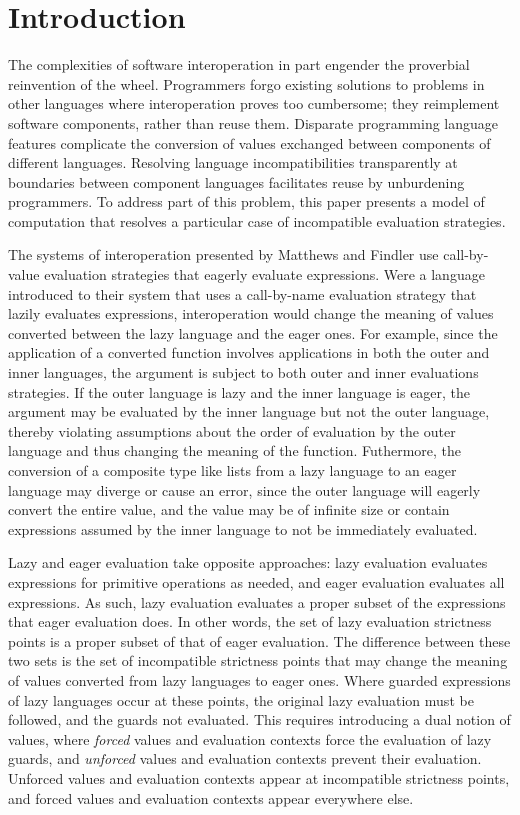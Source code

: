 \section{Introduction}

The complexities of software interoperation in part engender the proverbial reinvention of the wheel. Programmers forgo existing solutions to problems in other languages where interoperation proves too cumbersome; they reimplement software components, rather than reuse them. Disparate programming language features complicate the conversion of values exchanged between components of different languages. Resolving language incompatibilities transparently at boundaries between component languages facilitates reuse by unburdening programmers. To address part of this problem, this paper presents a model of computation that resolves a particular case of incompatible evaluation strategies.

The systems of interoperation presented by Matthews and Findler \cite{matthews07} use call-by-value evaluation strategies that eagerly evaluate expressions. Were a language introduced to their system that uses a call-by-name evaluation strategy that lazily evaluates expressions, interoperation would change the meaning of values converted between the lazy language and the eager ones. For example, since the application of a converted function involves applications in both the outer and inner languages, the argument is subject to both outer and inner evaluations strategies. If the outer language is lazy and the inner language is eager, the argument may be evaluated by the inner language but not the outer language, thereby violating assumptions about the order of evaluation by the outer language and thus changing the meaning of the function. Futhermore, the conversion of a composite type like lists from a lazy language to an eager language may diverge or cause an error, since the outer language will eagerly convert the entire value, and the value may be of infinite size or contain expressions assumed by the inner language to not be immediately evaluated.

Lazy and eager evaluation take opposite approaches: lazy evaluation evaluates expressions for primitive operations as needed, and eager evaluation evaluates all expressions. As such, lazy evaluation evaluates a proper subset of the expressions that eager evaluation does. In other words, the set of lazy evaluation strictness points is a proper subset of that of eager evaluation. The difference between these two sets is the set of incompatible strictness points that may change the meaning of values converted from lazy languages to eager ones. Where guarded expressions of lazy languages occur at these points, the original lazy evaluation must be followed, and the guards not evaluated. This requires introducing a dual notion of values, where \emph{forced} values and evaluation contexts force the evaluation of lazy guards, and \emph{unforced} values and evaluation contexts prevent their evaluation. Unforced values and evaluation contexts appear at incompatible strictness points, and forced values and evaluation contexts appear everywhere else.